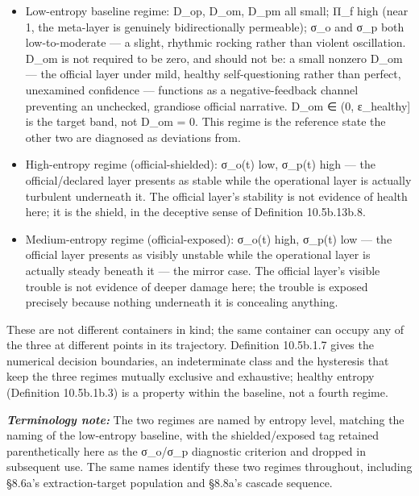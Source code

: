 \documentclass[
]{article}
\begin{document}
\begin{itemize}
\item
  Low-entropy baseline regime: D\_op, D\_om, D\_pm all small; Π\_f high
  (near 1, the meta-layer is genuinely bidirectionally permeable); σ\_o
  and σ\_p both low-to-moderate --- a slight, rhythmic rocking rather
  than violent oscillation. D\_om is not required to be zero, and should
  not be: a small nonzero D\_om --- the official layer under mild,
  healthy self-questioning rather than perfect, unexamined confidence
  --- functions as a negative-feedback channel preventing an unchecked,
  grandiose official narrative. D\_om ∈ (0, ε\_healthy{]} is the target
  band, not D\_om = 0. This regime is the reference state the other two
  are diagnosed as deviations from.
\item
  High-entropy regime (official-shielded): σ\_o(t) low, σ\_p(t) high ---
  the official/declared layer presents as stable while the operational
  layer is actually turbulent underneath it. The official layer's
  stability is not evidence of health here; it is the shield, in the
  deceptive sense of Definition 10.5b.13b.8.
\item
  Medium-entropy regime (official-exposed): σ\_o(t) high, σ\_p(t) low
  --- the official layer presents as visibly unstable while the
  operational layer is actually steady beneath it --- the mirror case.
  The official layer's visible trouble is not evidence of deeper damage
  here; the trouble is exposed precisely because nothing underneath it
  is concealing anything.
\end{itemize}

These are not different containers in kind; the same container can
occupy any of the three at different points in its trajectory.
Definition 10.5b.1.7 gives the numerical decision boundaries, an
indeterminate class and the hysteresis that keep the three regimes
mutually exclusive and exhaustive; healthy entropy (Definition
10.5b.1b.3) is a property within the baseline, not a fourth regime.

\emph{\textbf{Terminology note:}} The two regimes are named by entropy
level, matching the naming of the low-entropy baseline, with the
shielded/exposed tag retained parenthetically here as the σ\_o/σ\_p
diagnostic criterion and dropped in subsequent use. The same names
identify these two regimes throughout, including §8.6a's
extraction-target population and §8.8a's cascade sequence.
\end{document}
